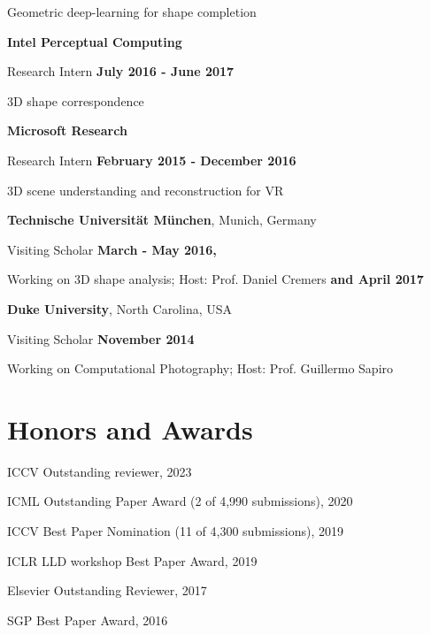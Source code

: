 \documentclass[margin,line]{res}
\begin{document}
\begin{resume}
\vspace{-.3cm}
{Geometric deep-learning for shape completion}

{\bf Intel Perceptual Computing} 

\vspace{-.3cm}
{Research Intern} \hfill {\bf July 2016 - June 2017}

\vspace{-.3cm}
{3D shape correspondence}

{\bf Microsoft Research} 

\vspace{-.3cm}
{Research Intern} \hfill {\bf February 2015 - December 2016}

\vspace{-.3cm}
{3D scene understanding and reconstruction for VR}

{\bf Technische Universit\"{a}t M\"{u}nchen}, Munich, Germany 

\vspace{-.3cm}
{Visiting Scholar} \hfill {\bf March - May 2016,}

\vspace{-.3cm}
{Working on 3D shape analysis; Host: Prof. Daniel Cremers}
\hfill {\bf and April 2017}

{\bf Duke University}, North Carolina, USA

\vspace{-.3cm}
{Visiting Scholar} \hfill {\bf November 2014}

\vspace{-.3cm}
{Working on Computational Photography; Host: Prof. Guillermo Sapiro} 

\section{\sc Honors and Awards}
ICCV Outstanding reviewer, 2023
\vspace*{-2.5mm}

ICML Outstanding Paper Award (2 of 4,990 submissions), 2020
\vspace*{-2.5mm}

ICCV Best Paper Nomination (11 of 4,300 submissions), 2019
\vspace*{-2.5mm}

ICLR LLD workshop Best Paper Award, 2019

\vspace*{-2.5mm}
Elsevier Outstanding Reviewer, 2017

\vspace*{-2.5mm}
SGP Best Paper Award, 2016


\end{resume}
\end{document}
